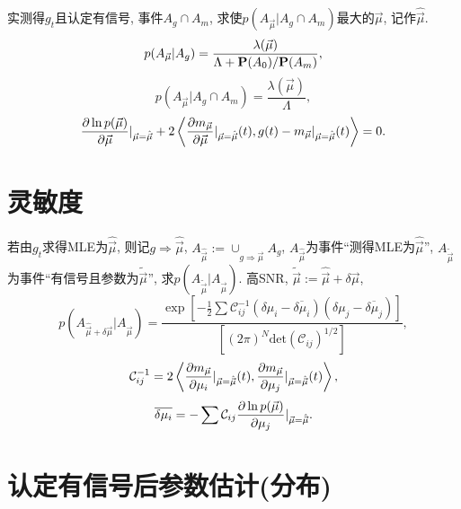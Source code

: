 实测得$g_t$且认定有信号, 事件$A_g\cap A_m$, 求使$p({A_{\vec{\mu}}}|A_g\cap A_m)$最大的$\vec{\mu}$, 记作$\hat{\vec{\mu}}$.
\begin{equation}
    p({A_{\vec{\mu}}}|A_g)=\frac{\lambda(\vec{\mu})}{\Lambda+\P(A_0)/\P(A_m)},
\end{equation}
\begin{equation}
    p({A_{\vec{\mu}}}|A_g\cap A_m)=\frac{\lambda(\vec{\mu})}{\Lambda},
\end{equation}
\begin{equation}
    \frac{\p\ln p(\vec{\mu})}{\p \vec{\mu}}|_{\vec{\mu}=\hat{\vec{\mu}}}+2\left\langle \frac{\p m_{\vec{\mu}}}{\p \vec{\mu}}|_{\vec{\mu}=\hat{\vec{\mu}}}(t),g(t)-m_{\vec{\mu}}|_{\vec{\mu}=\hat{\vec{\mu}}}(t)\right\rangle=0.
\end{equation}

\section{灵敏度}

若由$g_t$求得MLE为$\hat{\vec{\mu}}$, 则记$g\Rightarrow \hat{\vec{\mu}}$, $A_{\hat{\vec{\mu}}}:=\cup_{g\Rightarrow \hat{\vec{\mu}}}A_g$, $A_{\hat{\vec{\mu}}}$为事件``测得MLE为$\hat{\vec{\mu}}$'', $A_{\tilde{\vec{\mu}}}$为事件``有信号且参数为$\tilde{\vec{\mu}}$'', 求$p(A_{\tilde{\vec{\mu}}}|A_{\hat{\vec{\mu}}})$. 高SNR, $\tilde{\vec{\mu}}:=\hat{\vec{\mu}}+\delta\vec{\mu}$,
\begin{equation}
    p(A_{\hat{\vec{\mu}}+\delta\vec{\mu}}|A_{\hat{\vec{\mu}}})=\frac{\exp[-\frac{1}{2}\sum\mathcal{C}_{ij}^{-1}(\delta\mu_i-\overline{\delta\mu_i})(\delta\mu_j-\overline{\delta\mu_j})]}{[(2\pi)^N\text{det}(\mathcal{C}_{ij})^{1/2}]},
\end{equation}
\begin{equation}
    \mathcal{C}_{ij}^{-1}=2\left\langle \frac{\p m_{\vec{\mu}}}{\p \mu_i}|_{\vec{\mu}=\hat{\vec{\mu}}}(t),\frac{\p m_{\vec{\mu}}}{\p \mu_j}|_{\vec{\mu}=\hat{\vec{\mu}}}(t)\right\rangle,
\end{equation}
\begin{equation}
    \overline{\delta\mu_i}=-\sum\mathcal{C}_{ij}\frac{\p\ln p(\vec{\mu})}{\p \mu_j}|_{\vec{\mu}=\hat{\vec{\mu}}}.
\end{equation}

\section{认定有信号后参数估计(分布)}

